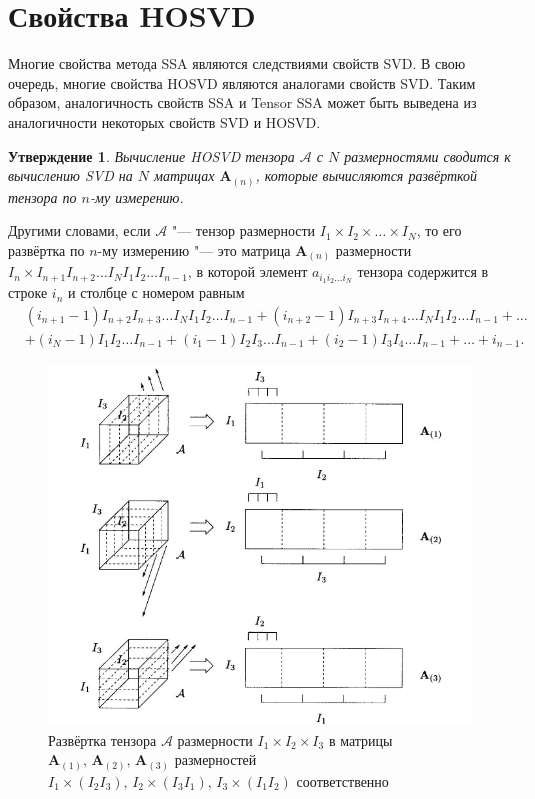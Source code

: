\documentclass[specialist,
    substylefile = spbu_report.rtx,
    subf,href,colorlinks=true, 12pt]{disser}
\theoremstyle{plain}
\newtheorem{statement}{Утверждение}[section]
\theoremstyle{definition}
\theoremstyle{remark}
\begin{document}
    \section{Свойства HOSVD}\label{sec:hosvd-properties}
    Многие свойства метода SSA являются следствиями свойств SVD\@.
    В свою очередь, многие свойства HOSVD являются аналогами свойств SVD\@.
    Таким образом, аналогичность свойств SSA и Tensor SSA может быть выведена из аналогичности некоторых свойств SVD и HOSVD\@.
    \begin{statement}
        Вычисление \emph{HOSVD} тензора $\mathcal{A}$ с $N$ размерностями сводится к вычислению \emph{SVD} на $N$ матрицах $\mathbf{A}_{(n)}$,
        которые вычисляются развёрткой тензора по $n$-му измерению.
    \end{statement}
    Другими словами, если $\mathcal{A}$ "--- тензор размерности $I_1\times I_2\times\ldots\times I_N$, то его развёртка
    по $n$-му измерению "--- это матрица $\mathbf{A}_{(n)}$ размерности $I_n\times I_{n+1}I_{n+2}\ldots I_{N}I_{1}I_{2}\ldots
    I_{n-1}$, в которой элемент $a_{i_1 i_2\ldots i_N}$ тензора содержится в строке $i_n$ и столбце с номером равным
    \[\begin{aligned}
          &(i_{n+1} - 1)I_{n+2}I_{n+3}\ldots I_{N}I_1 I_2\ldots I_{n-1} + (i_{n+2} - 1)I_{n+3}I_{n+4}\ldots I_N I_1 I_2 \ldots
          I_{n-1} + \dots \\
          &+(i_N - 1)I_1 I_2 \ldots I_{n-1} + (i_1 - 1)I_2 I_3\ldots I_{n-1} + (i_2 - 1)I_3 I_4\ldots I_{n-1} + \dots + i_{n-1}.
    \end{aligned}
    \]

    \begin{figure}[!h]
        \centering
        \includegraphics[width=\textwidth]{unfolding}
        \caption{Развёртка тензора $\mathcal{A}$ размерности $I_1\times I_2 \times I_3$ в матрицы $\mathbf{A}_{(1)},\,
        \mathbf{A}_{(2)},\, \mathbf{A}_{(3)}$ размерностей $I_1\times (I_2 I_3),\, I_2\times (I_3 I_1),\, I_3\times (I_1 I_2)$
            соответственно}
        \label{fig:unfolding}
    \end{figure}
\end{document}
